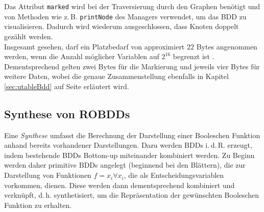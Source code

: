 Das Attribut \texttt{marked} wird bei der Traversierung durch den Graphen benötigt und von Methoden wie z.\,B. \texttt{printNode} des Managers verwendet, um das BDD zu visualisieren. Dadurch wird wiederum ausgeschlossen, dass Knoten doppelt gezählt werden.\\
Insgesamt gesehen, darf ein Platzbedarf von approximiert $22$ Bytes angenommen werden, wenn die Anzahl möglicher Variablen auf $2^{16}$ begrenzt ist \cite[S.81-82]{h2002}. Dementsprechend gelten zwei Bytes für die Markierung und jeweils vier Bytes für weitere Daten, wobei die genaue Zusammenstellung ebenfalls in Kapitel \ref{sec:utableBdd} auf Seite \pageref{sec:utableBdd} erläutert wird.

\subsection{Synthese von ROBDDs}
\label{sec:synthese}
Eine \emph{Synthese} umfasst die Berechnung der Darstellung einer Booleschen Funktion anhand bereits vorhandener Darstellungen. Dazu werden BDDs i.\,d.\,R. erzeugt, indem bestehende BDDs \glqq Bottom-up\grqq{} miteinander kombiniert werden. Zu Beginn werden daher primitive BDDs angelegt (beginnend bei den Blättern), die zur Darstellung von Funktionen $f = x_i \forall x_i$, die als Entscheidungsvariablen vorkommen, dienen. Diese werden dann dementsprechend kombiniert und verknüpft, d.\,h. synthetisiert, um die Repräsentation der gewünschten Booleschen Funktion zu erhalten.

